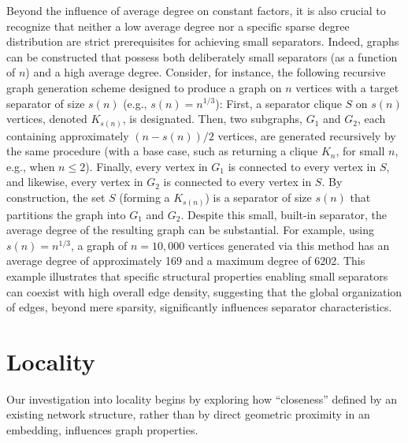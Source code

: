 Beyond the influence of average degree on constant factors, it is also crucial to recognize that neither a low average degree nor a specific sparse degree distribution are strict prerequisites for achieving small separators.
Indeed, graphs can be constructed that possess both deliberately small separators (as a function of \(n\)) and a high average degree.
Consider, for instance, the following recursive graph generation scheme designed to produce a graph on \(n\) vertices with a target separator of size \(s(n)\) (e.g., \(s(n) = n^{1/3}\)):
First, a separator clique \(S\) on \(s(n)\) vertices, denoted \(K_{s(n)}\), is designated.
Then, two subgraphs, \(G_1\) and \(G_2\), each containing approximately \((n-s(n))/2\) vertices, are generated recursively by the same procedure (with a base case, such as returning a clique \(K_n\), for small \(n\), e.g., when \(n \le 2\)).
Finally, every vertex in \(G_1\) is connected to every vertex in \(S\), and likewise, every vertex in \(G_2\) is connected to every vertex in \(S\).
By construction, the set \(S\) (forming a \(K_{s(n)}\)) is a separator of size \(s(n)\) that partitions the graph into \(G_1\) and \(G_2\).
Despite this small, built-in separator, the average degree of the resulting graph can be substantial.
For example, using \(s(n) = n^{1/3}\), a graph of \(n=10,000\) vertices generated via this method has an average degree of approximately 169 and a maximum degree of 6202.
This example illustrates that specific structural properties enabling small separators can coexist with high overall edge density, suggesting that the global organization of edges, beyond mere sparsity, significantly influences separator characteristics.

\section{Locality}
\label{sec:synthetic:locality}

Our investigation into locality begins by exploring how \enquote{closeness} defined by an existing network structure, rather than by direct geometric proximity in an embedding, influences graph properties.

